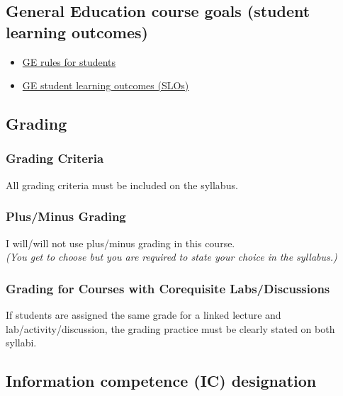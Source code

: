 \documentclass[
  letterpaper,
  DIV=11,
  numbers=noendperiod]{scrartcl}
\providecommand{\tightlist}{%
  \setlength{\itemsep}{0pt}\setlength{\parskip}{0pt}}\usepackage{longtable,booktabs,array}
\begin{document}
\subsection{General Education course goals (student learning
outcomes)}\label{general-education-course-goals-student-learning-outcomes}

\begin{itemize}
\tightlist
\item
  \href{https://catalog.csun.edu}{GE rules for students}\\
\item
  \href{https://catalog.csun.edu}{GE student learning outcomes (SLOs)}
\end{itemize}

\subsection{Grading}\label{grading}

\subsubsection{Grading Criteria}\label{grading-criteria}

All grading criteria must be included on the syllabus.

\subsubsection{Plus/Minus Grading}\label{plusminus-grading}

I will/will not use plus/minus grading in this course.\\
\emph{(You get to choose but you are required to state your choice in
the syllabus.)}

\subsubsection{Grading for Courses with Corequisite
Labs/Discussions}\label{grading-for-courses-with-corequisite-labsdiscussions}

If students are assigned the same grade for a linked lecture and
lab/activity/discussion, the grading practice must be clearly stated on
both syllabi.

\subsection{Information competence (IC)
designation}\label{information-competence-ic-designation}
\end{document}

